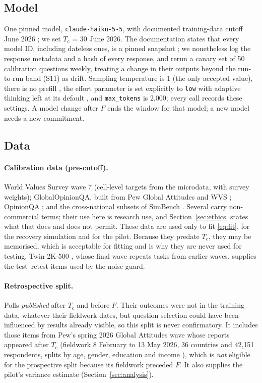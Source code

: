 \documentclass[11pt]{article}
\begin{document}
\subsection{Model}
One pinned model, \texttt{claude-haiku-5-5}, with documented training-data cutoff June 2026 \citep{anthropic2026models}; we set $T_c$ = 30 June 2026. The documentation states that every model ID, including dateless ones, is a pinned snapshot \citep{anthropic2026models}; we nonetheless log the response metadata and a hash of every response, and rerun a canary set of 50 calibration questions weekly, treating a change in their outputs beyond the run-to-run band (S11) as drift. Sampling temperature is 1 (the only accepted value), there is no prefill \citep{anthropic2026haiku55}, the effort parameter is set explicitly to \texttt{low} with adaptive thinking left at its default \citep{anthropic2026models}, and \texttt{max\_tokens} is 2{,}000; every call records these settings. A model change after $F$ ends the window for that model; a new model needs a new commitment.

\subsection{Data}
\paragraph{Calibration data (pre-cutoff).} World Values Survey wave 7 \citep{haerpfer2024wvs7} (cell-level targets from the microdata, with survey weights); GlobalOpinionQA, built from Pew Global Attitudes and WVS \citep{durmus2023global}; OpinionQA \citep{santurkar2023whose}; and the cross-national subsets of SimBench \citep{hu2025simbench}. Several carry non-commercial terms; their use here is research use, and Section~\ref{sec:ethics} states what that does and does not permit. These data are used only to fit \eqref{eq:fit}, for the recovery simulation and for the pilot. Because they predate $T_c$, they may be memorised, which is acceptable for fitting and is why they are never used for testing. Twin-2K-500 \citep{toubia2025twin}, whose final wave repeats tasks from earlier waves, supplies the test--retest items used by the noise guard.

\paragraph{Retrospective split.} Polls \emph{published} after $T_c$ and before $F$. Their outcomes were not in the training data, whatever their fieldwork dates, but question selection could have been influenced by results already visible, so this split is never confirmatory. It includes those items from Pew's spring 2026 Global Attitudes wave whose reports appeared after $T_c$ (fieldwork 8 February to 13 May 2026, 36 countries and 42{,}151 respondents, splits by age, gender, education and income \citep{pew2026ai}), which is \emph{not} eligible for the prospective split because its fieldwork preceded $F$. It also supplies the pilot's variance estimate (Section~\ref{sec:analysis}).
\end{document}
